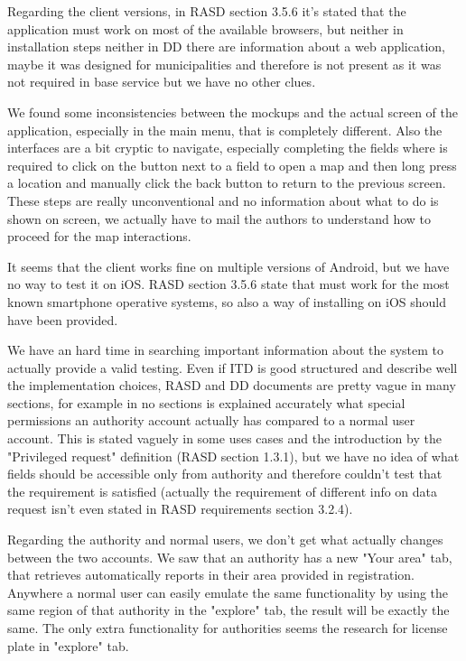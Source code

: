 Regarding the client versions, in RASD section 3.5.6 it's stated that the application must work on most of the available browsers, but neither in installation steps neither in DD there are information about a web application, maybe it was designed for municipalities and therefore is not present as it was not required in base service but we have no other clues.

We found some inconsistencies between the mockups and the actual screen of the application, especially in the main menu, that is completely different. Also the interfaces are a bit cryptic to navigate, especially completing the fields where is required to click on the button next to a field to open a map and then long press a location and manually click the back button to return to the previous screen. These steps are really unconventional and no information about what to do is shown on screen, we actually have to mail the authors to understand how to proceed for the map interactions.

It seems that the client works fine on multiple versions of Android, but we have no way to test it on iOS. RASD section 3.5.6 state that must work for the most known smartphone operative systems, so also a way of installing on iOS should have been provided.

We have an hard time in searching important information about the system to actually provide a valid testing. Even if ITD is good structured and describe well the implementation choices, RASD and DD documents are pretty vague in many sections, for example in no sections is explained accurately what special permissions an authority account actually has compared to a normal user account. This is stated vaguely in some uses cases and the introduction by the "Privileged request" definition (RASD section 1.3.1), but we have no idea of what fields should be accessible only from authority and therefore couldn't test that the requirement is satisfied (actually the requirement of different info on data request isn't even stated in RASD requirements section 3.2.4).

Regarding the authority and normal users, we don't get what actually changes between the two accounts. We saw that an authority has a new "Your area" tab, that retrieves automatically reports in their area provided in registration. Anywhere a normal user can easily emulate the same functionality by using the same region of that authority in the "explore" tab, the result will be exactly the same. The only extra functionality for authorities seems the research for license plate in "explore" tab. 